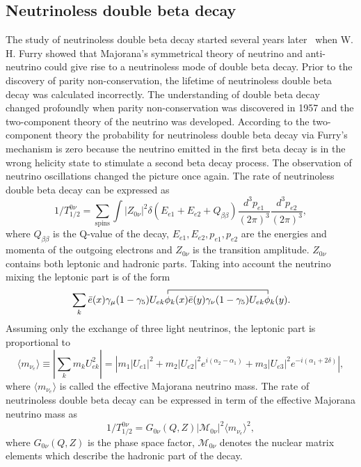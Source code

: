 \subsection{Neutrinoless double beta decay}
\label{sec:0n2brate}
The study of neutrinoless double beta decay started several years
later~\cite{Rac37,Fur37} when W. H. Furry showed that Majorana's
symmetrical theory of neutrino and anti-neutrino could give rise to a
neutrinoless mode of double beta decay. Prior to the discovery of
parity non-conservation, the lifetime of neutrinoless double beta
decay was calculated incorrectly. The understanding of double beta
decay changed profoundly when parity non-conservation was discovered
in 1957 and the two-component theory of the neutrino was developed.
According to the two-component theory the probability for neutrinoless
double beta decay via Furry's mechanism is zero because the neutrino
emitted in the first beta decay is in the wrong helicity state to
stimulate a second beta decay process. The observation of neutrino
oscillations changed the picture once again. The rate of neutrinoless
double beta decay can be expressed as
\begin{equation}
  \label{eq:0nura}
  1/T^{0\nu}_{1/2} = \sum_{\text{spins}} \int |Z_{0\nu}|^{2}
\delta(E_{e1} + E_{e2} + Q_{\beta\beta})
\frac{d^{3}p_{e1}}{(2\pi)^{3}} \frac{d^{3}p_{e2}}{(2\pi)^{3}},
\end{equation}
where $Q_{\beta\beta}$ is the Q-value of the decay, $E_{e1}, E_{e2},
p_{e1}, p_{e2}$ are the energies and momenta of the outgoing electrons
and $Z_{0\nu}$ is the transition amplitude. $Z_{0\nu}$ contains both
leptonic and hadronic parts. Taking into account the neutrino mixing
the leptonic part is of the form
\begin{equation}
  \label{eq:leppar}
  \contraction{\sum_{k}\bar{e}(x)\gamma_{\mu}(1-\gamma_{5})U_{ek}}
  {\phi}{{}_{k}(x)\bar{e}(y)\gamma_{\nu}(1-\gamma_{5})U_{ek}}{\phi}
  \sum_{k}\bar{e}(x)\gamma_{\mu}(1-\gamma_{5})U_{ek}\phi_{k}(x)
  \bar{e}(y)\gamma_{\nu}(1-\gamma_{5})U_{ek}\phi_{k}(y).
\end{equation}
Assuming only the exchange of three light neutrinos, the leptonic part
is proportional to 
\begin{equation}
  \label{eq:effmass}
  \langle m_{\nu_{e}} \rangle \equiv \left| \sum_{k}m_{k}U^{2}_{ek}
\right| = \left| m_{1}|U_{e1}|^{2} +
m_{2}|U_{e2}|^{2}e^{i(\alpha_{2}-\alpha_{1})} +
m_{3}|U_{e3}|^{2}e^{-i(\alpha_{1}+2\delta)} \right|,
\end{equation}
where $\langle m_{\nu_{e}} \rangle$ is called the effective Majorana
neutrino mass. The rate of neutrinoless double beta decay can be
expressed in term of the effective Majorana neutrino mass as
\begin{equation}
  \label{eq:0nurate}
  1/T^{0\nu}_{1/2} = G_{0\nu}(Q,Z) |\mathcal{M}_{0\nu}|^{2} \langle
m_{\nu_{e}} \rangle^{2},
\end{equation}
where $G_{0\nu}(Q,Z)$ is the phase space factor, $\mathcal{M}_{0\nu}$
denotes the nuclear matrix elements which describe the hadronic part
of the decay. 

